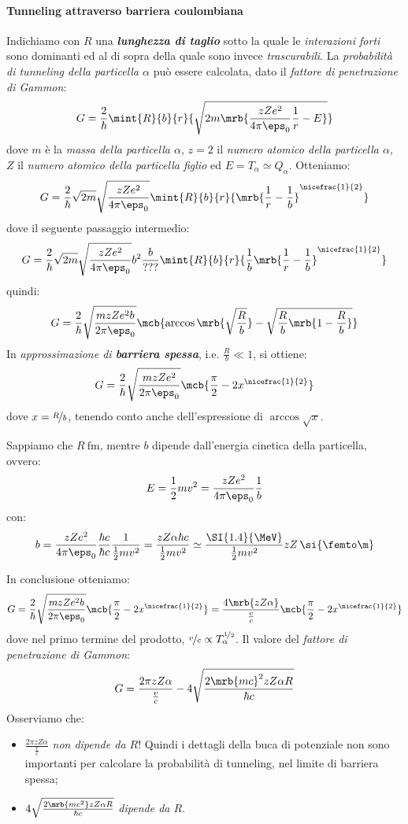 \paragraph{Tunneling attraverso barriera coulombiana}
Indichiamo con $R$ una \textit{\textbf{lunghezza di taglio}} sotto la quale le
\textit{interazioni forti} sono dominanti ed al di sopra della quale sono
invece \textit{trascurabili}.
La \textit{probabilità di tunneling della particella $\alpha$} può essere
calcolata, dato il \textit{fattore di penetrazione di Gammon}:
\[
  G = \frac{2}{\hbar} \mint{R}{b}{r}{\sqrt{2 m \mrb{\frac{zZ e^2}{4 \pi \eps_0}
  \frac{1}{r} - E}}}
\]
dove $m$ è la \textit{massa della particella $\alpha$}, $z = 2$ il
\textit{numero atomico della particella $\alpha$}, $Z$ il \textit{numero
atomico della particella figlio} ed $E = T _{\alpha} \simeq Q _{\alpha}$.
Otteniamo:
\[
  G = \frac{2}{\hbar} \sqrt{2 m} \sqrt{\frac{z Z e^2}{4 \pi \eps_0}}
  \mint{R}{b}{r}{\mrb{\frac{1}{r} - \frac{1}{b}}^{\nicefrac{1}{2}}}
\]
dove il seguente passaggio intermedio:
\[
  G = \frac{2}{\hbar} \sqrt{2 m} \sqrt{\frac{z Z e^2}{4 \pi \eps_0}}
  b^2 \frac{b}{???} \mint{R}{b}{r}{\frac{1}{b} \mrb{\frac{1}{r} -
  \frac{1}{b}}^{\nicefrac{1}{2}}} %
\]
quindi:
\[
  G = \frac{2}{\hbar} \sqrt{\frac{m zZ e^2 b}{2 \pi \eps_0}} \mcb{\arccos
  \mrb{\sqrt{\frac{R}{b}}} - \sqrt{\frac{R}{b} \mrb{1 - \frac{R}{b}}}}
\]
In \textit{approssimazione di \textbf{barriera spessa}}, i.e. $\frac{R}{b} \ll
1$, si ottiene:
\[
  G = \frac{2}{\hbar} \sqrt{\frac{m zZ e^2}{2 \pi \eps_0}} \mcb{\frac{\pi}{2} -
  2 x ^{\nicefrac{1}{2}}}
\]
dove $x = \nicefrac{R}{b}$, tenendo conto anche dell'espressione di
$\arccos{\sqrt{x}}$.

Sappiamo che $R ~ \si{\femto\m}$, mentre $b$ dipende dall'energia cinetica
della particella, ovvero:
\[
  E = \frac{1}{2} m v^2 = \frac{zZ e^2}{4 \pi \eps_0} \frac{1}{b}
\]
con:
\[
  b =\frac{zZ e^2}{4 \pi \eps_0}  \frac{\hbar c}{\hbar c} \frac{1}{\frac{1}{2}
  m v^2} = \frac{zZ \alpha \hbar c}{\frac{1}{2} m v^2} \simeq
  \frac{\SI{1.4}{\MeV}}{\frac{1}{2} m v^2} zZ\, \si{\femto\m}
\]

In conclusione otteniamo:
\[
  G = \frac{2}{\hbar} \sqrt{\frac{mzZ e^2 b}{2 \pi \eps_0}} \mcb{\frac{\pi}{2}
  - 2 x ^{\nicefrac{1}{2}}} = \frac{4 \mrb{zZ \alpha}}{\frac{v}{c}}
  \mcb{\frac{\pi}{2} - 2 x ^{\nicefrac{1}{2}}}
\]
dove nel primo termine del prodotto, $\nicefrac{v}{c} \propto T
_{\alpha}^{\nicefrac{1}{2}}$.
Il valore del \textit{fattore di penetrazione di Gammon}:
\[
  G = \frac{2 \pi zZ \alpha}{\frac{v}{c}} -4 \sqrt{\frac{2 \mrb{mc}^{2} zZ
  \alpha R}{\hbar c}}
\]
Osserviamo che:
\begin{itemize}
  \item $\frac{2 \pi zZ \alpha}{\frac{v}{c}}$ \textit{non dipende da $R$}!
    Quindi i dettagli della buca di potenziale non sono importanti per
    calcolare la probabilità di tunneling, nel limite di barriera spessa;
  \item $4 \sqrt{\frac{2 \mrb{mc^2} zZ \alpha R}{\hbar c}}$ \textit{dipende
    da $R$}.
\end{itemize}

